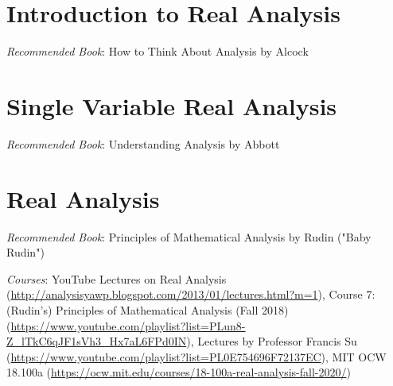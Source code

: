 \documentclass[openany,10pt]{book}
\begin{document}
\chapter{Introduction to Real Analysis}

\textit{Recommended Book}: How to Think About Analysis by Alcock\newline


\chapter{Single Variable Real Analysis}

\textit{Recommended Book}: Understanding Analysis by Abbott\newline


\chapter{Real Analysis}

\textit{Recommended Book}: Principles of Mathematical Analysis by Rudin ("Baby Rudin")\newline

\noindent \textit{Courses}: YouTube Lectures on Real Analysis (\url{http://analysisyawp.blogspot.com/2013/01/lectures.html?m=1}), Course 7: (Rudin's) Principles of Mathematical Analysis (Fall 2018) (\url{https://www.youtube.com/playlist?list=PLun8-Z_lTkC6qJF1sVh3_Hx7aL6FPd0IN}), Lectures by Professor Francis Su (\url{https://www.youtube.com/playlist?list=PL0E754696F72137EC}), MIT OCW 18.100a (\url{https://ocw.mit.edu/courses/18-100a-real-analysis-fall-2020/})\newline
\end{document}
